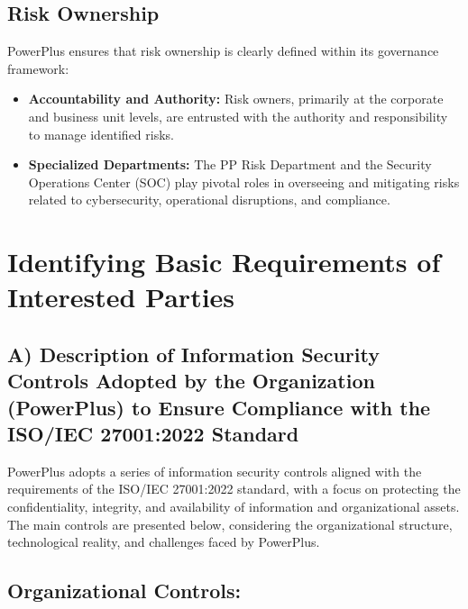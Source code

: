 \subsection{Risk Ownership}

PowerPlus ensures that risk ownership is clearly defined within its governance framework:

\begin{itemize}
    \item \textbf{Accountability and Authority:} Risk owners, primarily at the corporate and business unit levels, are entrusted with the authority and responsibility to manage identified risks.
    \item \textbf{Specialized Departments:} The PP Risk Department and the Security Operations Center (SOC) play pivotal roles in overseeing and mitigating risks related to cybersecurity, operational disruptions, and compliance.
\end{itemize}

\section{Identifying Basic Requirements of Interested Parties}

\subsection*{A) Description of Information Security Controls Adopted by the Organization (PowerPlus) to Ensure Compliance with the ISO/IEC 27001:2022 Standard}

PowerPlus adopts a series of information security controls aligned with the requirements of the ISO/IEC 27001:2022 standard, with a focus on protecting the confidentiality, integrity, and availability of information and organizational assets. The main controls are presented below, considering the organizational structure, technological reality, and challenges faced by PowerPlus.

\subsection*{Organizational Controls:}

